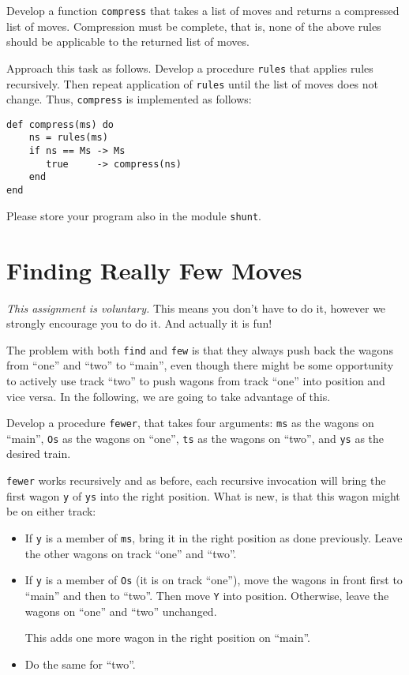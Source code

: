 \documentclass[a4paper,11pt]{article}
\begin{document}
Develop a function \verb+compress+ that takes a list of moves and
returns a compressed list of moves. Compression must be complete,
that is, none of the above rules should be applicable to the
returned list of moves.

Approach this task as follows. Develop a procedure
\verb+rules+ that applies rules recursively. Then repeat
application of \verb+rules+ until the list of moves does not
change. Thus, \verb+compress+ is implemented as follows:
\begin{verbatim}
def compress(ms) do
    ns = rules(ms)
    if ns == Ms -> Ms
       true     -> compress(ns)
    end
end
\end{verbatim}

Please store your program also in the module \verb+shunt+.

\section{Finding Really Few Moves}

\emph{This assignment is voluntary.} This means you don't have to
do it, however we strongly encourage you to do it. And actually
it is fun!

The problem with both \verb+find+ and \verb+few+ is that they
always push back the wagons from ``one'' and ``two'' to ``main'',
even though there might be some opportunity to actively use track
``two'' to push wagons from track ``one'' into position and vice
versa. In the following, we are going to take advantage of this.

Develop a procedure \verb+fewer+, that takes four arguments:
\verb+ms+ as the wagons on ``main'', \verb+Os+ as the wagons on ``one'',
\verb+ts+ as the wagons on ``two'', and \verb+ys+ as the desired train.

\verb+fewer+ works recursively and as before, each recursive
invocation will bring the first wagon \verb+y+ of \verb+ys+ into the right
position. What is new, is that this wagon might be on either
track:
\begin{itemize}
\item If \verb+y+ is a member of \verb+ms+, bring it in the right
  position as done previously. Leave the other wagons on track
  ``one'' and ``two''.
\item If \verb+y+ is a member of \verb+Os+ (it is on track ``one''), move
  the wagons in front first to ``main'' and then to ``two''. Then
  move \verb+Y+ into position. Otherwise, leave the wagons on ``one''
  and ``two'' unchanged.

  This adds one more wagon in the right position on ``main''.
\item Do the same for ``two''.
\end{itemize}
\end{document}
